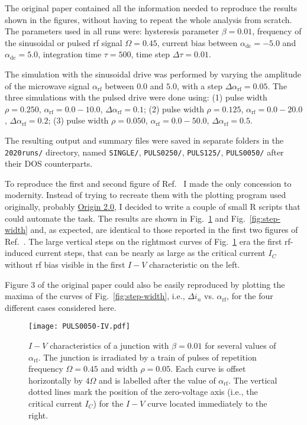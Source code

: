 The original paper  contained all the information needed to reproduce the results shown in the figures, without having to repeat the whole analysis from scratch. 
The parameters used in all runs were: hysteresis parameter $\beta = 0.01$, frequency of the sinusoidal or pulsed  rf signal $\Omega = 0.45$, current bias between $\alpha_\mathrm{dc} = -5.0$ and $\alpha_\mathrm{dc} = 5.0$, integration time $\tau = 500$, time step $\Delta \tau = 0.01$. 

The simulation with the sinusoidal drive was performed by varying the amplitude of the microwave signal $\alpha_\mathrm{rf}$ between $0.0$ and $5.0$, with a step $\Delta \alpha_\mathrm{rf} = 0.05$.
The three simulations with the pulsed drive were done using: 
(1) pulse width $\rho = 0.250$, $\alpha_\mathrm{rf} = 0.0 - 10.0$, $\Delta \alpha_\mathrm{rf} = 0.1$;
(2) pulse width $\rho = 0.125$, $\alpha_\mathrm{rf} = 0.0 - 20.0$, $\Delta \alpha_\mathrm{rf} = 0.2$;
(3) pulse width $\rho = 0.050$, $\alpha_\mathrm{rf} = 0.0 - 50.0$, $\Delta \alpha_\mathrm{rf} = 0.5$.

The resulting output and summary files were saved in separate folders in the \texttt{2020runs/} directory, named \texttt{SINGLE/}, \texttt{PULS0250/}, \texttt{PULS125/}, \texttt{PULS0050/} after their DOS counterparts.

To reproduce the first and second figure of Ref.~\cite{Maggi:1996} I made the only concession to modernity. Instead of trying to recreate them with the plotting program used originally, probably \href{https://www.originlab.com}{Origin 2.0}, I decided to write a couple of small R scripts that could automate the task.
The results are shown in Fig.~\ref{fig:pulsed-ivs} and Fig.~\ref{fig:step-width} and, as expected, are identical to those reported in the first two figures of Ref.~\cite{Maggi:1996}. 
The large vertical steps on the rightmost curves of Fig.~\ref{fig:pulsed-ivs} era the first rf-induced current steps, that can be nearly as large as the critical current $I_C$ without rf bias visible in the first $I - V$ characteristic on the left.

Figure 3 of the original paper could also be easily reproduced by plotting the maxima of the curves of Fig.~\ref{fig:step-width}, i.e., $\Delta i_n$ vs. $\alpha_\mathrm{rf}$, for the four different cases considered here.

\begin{figure}[t]
	\centering
	\texttt{[image: PULS0050-IV.pdf]}
	\caption{$I - V$ characteristics of a junction with $\beta = 0.01$ for several values of $\alpha_\mathrm{rf}$. The junction is  irradiated by a train of pulses of repetition frequency $\Omega = 0.45$ and width $\rho = 0.05$. Each curve is offset horizontally by $4 \Omega$ and is labelled after the value of $\alpha_\mathrm{rf}$. The vertical dotted lines mark the position of the zero-voltage axis (i.e., the critical current $I_C$) for the $I - V$ curve located immediately to the right.}
	\label{fig:pulsed-ivs}
\end{figure}

